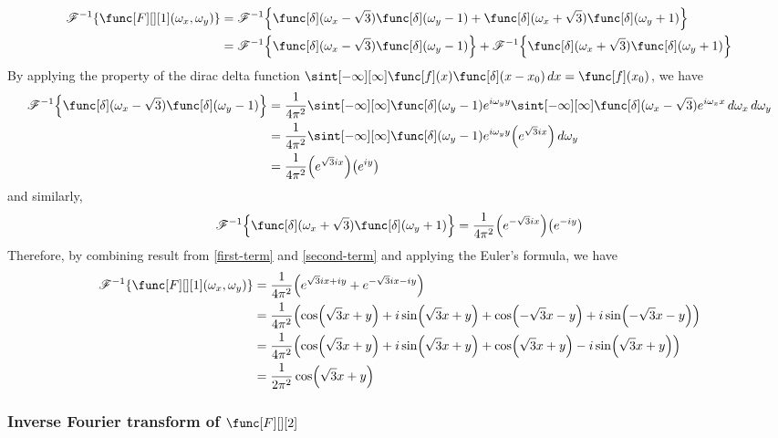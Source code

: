 \begin{align}
\invfourier{\func[F][][1](\omega_x,\omega_y)} 
&= \invfourier{\func[\delta](\omega_x - \sqrt{3})\func[\delta](\omega_y - 1) + \func[\delta](\omega_x + \sqrt{3})\func[\delta](\omega_y + 1)} \\
&= \invfourier{\func[\delta](\omega_x - \sqrt{3})\func[\delta](\omega_y - 1)} + \invfourier{\func[\delta](\omega_x + \sqrt{3})\func[\delta](\omega_y + 1)}
\end{align}
By applying the property of the dirac delta function $\sint[-\infty][\infty] \func[f](x)\func[\delta](x - x_0) \dx = \func[f](x_0)$, we have
\begin{align}
\invfourier{\func[\delta](\omega_x - \sqrt{3})\func[\delta](\omega_y - 1)}
&= \frac{1}{4\pi^2} \sint[-\infty][\infty]  \func[\delta](\omega_y - 1) e^{i\omega_y y} \sint[-\infty][\infty] \func[\delta](\omega_x - \sqrt{3}) e^{i\omega_x x} \domega_x  \domega_y \\
&= \frac{1}{4\pi^2} \sint[-\infty][\infty]  \func[\delta](\omega_y - 1) e^{i\omega_y y} \parens*{e^{\sqrt{3} ix}}  \domega_y \\
&= \frac{1}{4\pi^2} \parens*{e^{\sqrt{3} ix}} \parens*{e^{iy}} \label{first-term}
\end{align}
and similarly,
\begin{equation}
    \invfourier{\func[\delta](\omega_x + \sqrt{3})\func[\delta](\omega_y + 1)} = \frac{1}{4\pi^2} \parens*{e^{-\sqrt{3} ix}} \parens*{e^{-iy}} \label{second-term}
\end{equation}
Therefore, by combining result from \eqref{first-term} and \eqref{second-term} and applying the Euler's formula, we have
\begin{align}
\invfourier{\func[F][][1](\omega_x,\omega_y)} 
&= \frac{1}{4\pi^2} \parens*{{e^{\sqrt{3} ix + iy}} + {e^{-\sqrt{3} ix - iy}}} \label{combine} \\
&= \frac{1}{4\pi^2} \parens*{\cos(\sqrt{3}x + y) + i\sin(\sqrt{3}x + y) + \cos(-\sqrt{3}x - y) + i\sin(-\sqrt{3}x - y)} \\
&= \frac{1}{4\pi^2} \parens*{\cos(\sqrt{3}x + y) + i\sin(\sqrt{3}x + y) + \cos(\sqrt{3}x + y) - i\sin(\sqrt{3}x + y)} \\
&= \frac{1}{2\pi^2} \cos(\sqrt{3}x + y) \label{result-1}
\end{align}

\subsubsection{Inverse Fourier transform of $\func[F][][2]$}

